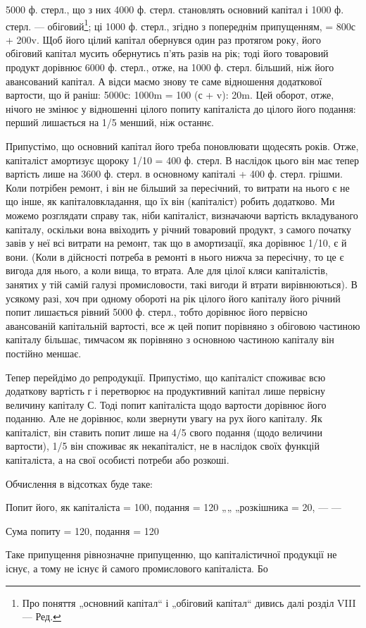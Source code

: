 \parcont{}  %
5000 ф. стерл., що з них 4000 ф. стерл. становлять основний капітал і
1000 ф. стерл. — обіговий\footnote*{
Про поняття „основний капітал“ і „обіговий капітал“ дивись далі розділ
VIII — Ред.
}; ці 1000 ф. стерл., згідно з попереднім
припущенням, = 800с + 200v. Щоб його цілий капітал обернувся
один раз протягом року, його обіговий капітал мусить обернутись п’ять
разів на рік; тоді його товаровий продукт дорівнює 6000 ф. стерл.,
отже, на 1000 ф. стерл. більший, ніж його авансований капітал. А відси
маємо знову те саме відношення додаткової вартости, що й раніш:
5000с: 1000m = 100 (с + v): 20m. Цей оборот, отже, нічого не
змінює у відношенні цілого попиту капіталіста до цілого його подання:
перший лишається на 1/5 менший, ніж останнє.

Припустімо, що основний капітал його треба поновлювати щодесять
років. Отже, капіталіст амортизує щороку 1/10 = 400 ф. стерл. В наслідок
цього він має тепер вартість лише на 3600 ф. стерл. в основному капіталі
+ 400 ф. стерл. грішми. Коли потрібен ремонт, і він не більший за
пересічний, то витрати на нього є не що інше, як капіталовкладання, що
їх він (капіталіст) робить додатково. Ми можемо розглядати справу так,
ніби капіталіст, визначаючи вартість вкладуваного капіталу, оскільки
вона ввіходить у річний товаровий продукт, з самого початку завів у
неї всі витрати на ремонт, так що в амортизації, яка дорівнює 1/10,
є й вони. (Коли в дійсності потреба в ремонті в нього нижча
за пересічну, то це є вигода для нього, а коли вища, то втрата. Але
для цілої кляси капіталістів, занятих у тій самій галузі промисловости,
такі вигоди й втрати вирівнюються). В усякому разі, хоч при одному
обороті на рік цілого його капіталу його річний попит лишається рівний
5000 ф. стерл., тобто дорівнює його первісно авансованій капітальній
вартості, все ж цей попит порівняно з обіговою частиною капіталу
більшає, тимчасом як порівняно з основною частиною капіталу він постійно
меншає.

Тепер перейдімо до репродукції. Припустімо, що капіталіст споживає
всю додаткову вартість г і перетворює на продуктивний капітал лише
первісну величину капіталу С. Тоді попит капіталіста щодо вартости
дорівнює його поданню. Але не дорівнює, коли звернути увагу на рух
його капіталу. Як капіталіст, він ставить попит лише на 4/5 свого подання
(щодо величини вартости), 1/5 він споживає як некапіталіст, не
в наслідок своїх функцій капіталіста, а на свої особисті потреби або
розкоші.

Обчислення в відсотках буде таке:

Попит його, як капіталіста = 100, подання = 120
    „„       „розкішника = 20, — —

            Сума попиту = 120, подання = 120

Таке припущення рівнозначне припущенню, що капіталістичної продукції
не існує, а тому не існує й самого промислового капіталіста. Бо
\parbreak{}  %
